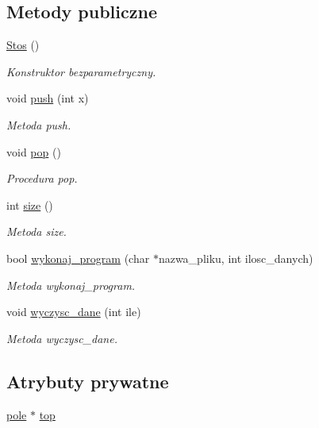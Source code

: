\subsection*{Metody publiczne}
\begin{DoxyCompactItemize}
\item 
\hyperlink{class_stos_a1de3b50386d5dfb56ddece17d0ea2389}{Stos} ()
\begin{DoxyCompactList}\small\item\em Konstruktor bezparametryczny. \end{DoxyCompactList}\item 
void \hyperlink{class_stos_a08bb7c9208d9a81d30fe569deceb946f}{push} (int x)
\begin{DoxyCompactList}\small\item\em Metoda push. \end{DoxyCompactList}\item 
void \hyperlink{class_stos_a88b0da41b49ef4d4b63cfd4924665683}{pop} ()
\begin{DoxyCompactList}\small\item\em Procedura pop. \end{DoxyCompactList}\item 
int \hyperlink{class_stos_a696195d5125d9bbe6b491bc5985f9461}{size} ()
\begin{DoxyCompactList}\small\item\em Metoda size. \end{DoxyCompactList}\item 
bool \hyperlink{class_stos_a7b9d5405298070fa7cbd3389a99dbcc8}{wykonaj\-\_\-program} (char $\ast$nazwa\-\_\-pliku, int ilosc\-\_\-danych)
\begin{DoxyCompactList}\small\item\em Metoda wykonaj\-\_\-program. \end{DoxyCompactList}\item 
void \hyperlink{class_stos_aa54f9d021e324f5a204dbc8193dd9a6e}{wyczysc\-\_\-dane} (int ile)
\begin{DoxyCompactList}\small\item\em Metoda wyczysc\-\_\-dane. \end{DoxyCompactList}\end{DoxyCompactItemize}
\subsection*{Atrybuty prywatne}
\begin{DoxyCompactItemize}
\item 
\hyperlink{structpole}{pole} $\ast$ \hyperlink{class_stos_adcfbb6ee470a16fa67eddb412dc556a0}{top}
\end{DoxyCompactItemize}
